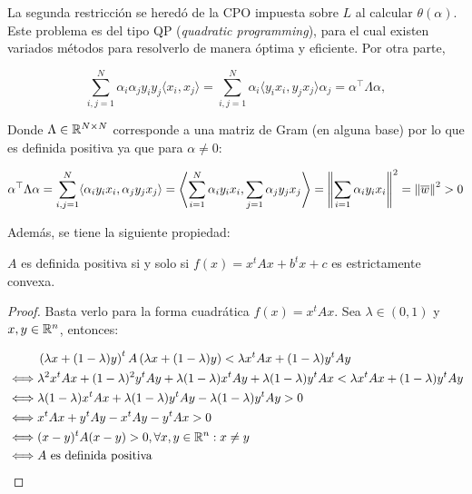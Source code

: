La segunda restricción se heredó de la CPO impuesta sobre $L$ al calcular $\theta(\alpha)$. Este problema es del tipo QP (\emph{quadratic programming}), para el cual existen variados métodos para resolverlo de manera óptima y eficiente. Por otra parte,

\begin{equation}
\sum\limits_{i,j=1}^{N} \alpha_i \alpha_j y_i y_j \langle x_i, x_j\rangle = \sum\limits_{i,j=1}^{N}  \alpha_i \langle   y_i x_i,  y_jx_j\rangle \alpha_j = \alpha^\top \Lambda \alpha,
\end{equation}
 
Donde $\Lambda\in\mathbb{R}^{N\times N}$ corresponde a una matriz de Gram (en alguna base) por lo que es definida positiva ya que para $\alpha\neq 0$:

\begin{equation}
	\alpha^\top \Lambda \alpha = \sum\limits_{i,j=1}^{N}   \langle   \alpha_i y_i x_i,  \alpha_j y_jx_j\rangle = \left\langle\sum\limits_{i=1}^{N}      \alpha_i y_i x_i,  \sum\limits_{j=1} \alpha_j y_jx_j\right\rangle = \left\lVert\sum\limits_{i=1} \alpha_i y_i x_i\right\rVert^2 = \left\lVert\overline{w}\right\rVert^2>0 
\end{equation}

Además, se tiene la siguiente propiedad:

\begin{lemma}
	$A$ es definida positiva si y solo si $f(x)= x^tAx + b^tx + c$ es estrictamente convexa.
\end{lemma}

\begin{proof}
	Basta verlo para la forma cuadrática $f(x)=x^tAx$. Sea $\lambda\in (0,1)$ y $x,y\in\mathbb{R}^n$, entonces:

\begin{align*}
	&\left(\lambda x+(1-\lambda)y\right)^t A \left(\lambda x+(1-\lambda)y\right) <\lambda x^tAx + (1-\lambda)y^tAy\\
			\iff &\lambda^2 x^tAx + (1-\lambda)^2 y^tAy + \lambda(1-\lambda)x^tAy + \lambda(1-\lambda)y^tAx < \lambda x^t Ax+(1-\lambda)y^tAy\\
			\iff & \lambda(1-\lambda)x^tAx+\lambda(1-\lambda)y^tAy-\lambda(1-\lambda)y^tAy> 0\\
			\iff & x^tAx+y^tAy-x^tAy-y^tAx> 0\\
			\iff & (x-y)^tA(x-y)> 0, \forall x,y\in \mathbb{R}^n:x\neq y\\
			\iff &A \text{ es definida positiva}
\end{align*}
\end{proof}

